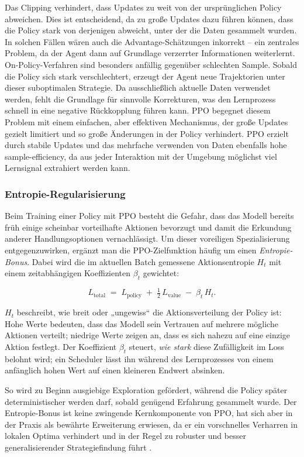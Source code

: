 Das Clipping verhindert, dass Updates zu weit von der ursprünglichen Policy abweichen. Dies ist entscheidend, da zu große Updates dazu führen können, dass die Policy stark von derjenigen abweicht, unter der die Daten gesammelt wurden. In solchen Fällen wären auch die Advantage-Schätzungen inkorrekt – ein zentrales Problem, da der Agent dann auf Grundlage verzerrter Informationen weiterlernt. On-Policy-Verfahren sind besonders anfällig gegenüber schlechten Sample. Sobald die Policy sich stark verschlechtert, erzeugt der Agent neue Trajektorien unter dieser suboptimalen Strategie. Da ausschließlich aktuelle Daten verwendet werden, fehlt die Grundlage für sinnvolle Korrekturen, was den Lernprozess schnell in eine negative Rückkopplung führen kann. PPO begegnet diesem Problem mit einem einfachen, aber effektiven Mechanismus, der große Updates gezielt limitiert und so große Änderungen in der Policy verhindert. PPO erzielt durch stabile Updates und das mehrfache verwenden von Daten ebenfalls hohe sample-efficiency, da aus jeder Interaktion mit der Umgebung möglichst viel Lernsignal extrahiert werden kann.

\subsubsection*{Entropie-Regularisierung}

Beim Training einer Policy mit PPO besteht die Gefahr, dass das Modell bereits früh einige scheinbar vorteilhafte Aktionen bevorzugt und damit die Erkundung anderer Handlungsoptionen vernachlässigt.  
Um dieser voreiligen Spezialisierung entgegenzuwirken, ergänzt man die PPO-Zielfunktion häufig um einen \emph{Entropie-Bonus}.  
Dabei wird die im aktuellen Batch gemessene Aktionsentropie \(H_t\) mit einem zeitabhängigen Koeffizienten \(\beta_t\) gewichtet:

\[
L_{\text{total}}
  \;=\;
  L_{\text{policy}}
  \;+\;
  \tfrac12\,L_{\text{value}}
  \;-\;
  \beta_t \, H_t .
\]

\(H_t\) beschreibt, wie breit oder „ungewiss“ die Aktionsverteilung der Policy ist:  
Hohe Werte bedeuten, dass das Modell sein Vertrauen auf mehrere mögliche Aktionen verteilt; niedrige Werte zeigen an, dass es sich nahezu auf eine einzige Aktion festlegt.  
Der Koeffizient \(\beta_t\) steuert, \emph{wie stark} diese Zufälligkeit im Loss belohnt wird; ein Scheduler lässt ihn während des Lernprozesses von einem anfänglich hohen Wert auf einen kleineren Endwert absinken.  

So wird zu Beginn ausgiebige Exploration gefördert, während die Policy später deterministischer werden darf, sobald genügend Erfahrung gesammelt wurde.  
Der Entropie-Bonus ist keine zwingende Kernkomponente von PPO, hat sich aber in der Praxis als bewährte Erweiterung erwiesen, da er ein vorschnelles Verharren in lokalen Optima verhindert und in der Regel zu robuster und besser generalisierender Strategiefindung führt \cite{schulman2017proximalpolicyoptimizationalgorithms}. 